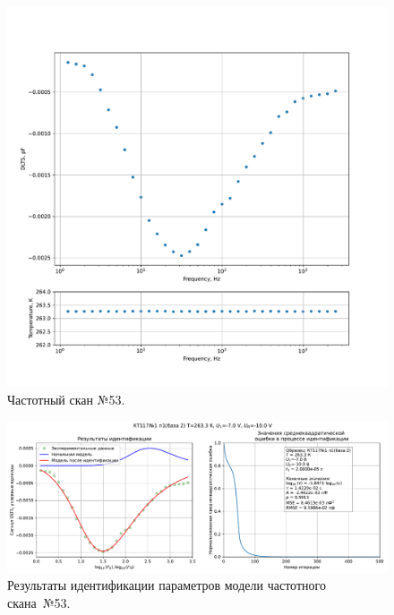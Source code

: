 \begin{figure}[!ht]
    \centering
    \includegraphics[width=1\textwidth]{../plots/КТ117№1_п1(база 2)_2500Гц-1Гц_1пФ_-10С_-7В-10В_50мВ_20мкс_шаг_0,1.pdf}
    \caption{Частотный скан №53.}
    \label{pic:frequency_scan_53}
\end{figure}

\begin{figure}[!ht]
    \centering
    \includegraphics[width=1\textwidth]{../plots/КТ117№1_п1(база 2)_2500Гц-1Гц_1пФ_-10С_-7В-10В_50мВ_20мкс_шаг_0,1_model.pdf}
    \caption{Результаты идентификации параметров модели частотного скана~№53.}
    \label{pic:frequency_scan_model53}
\end{figure}

\pagebreak


